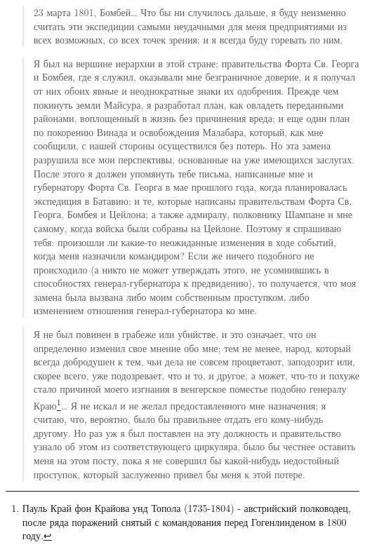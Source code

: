 \documentclass[
  oneside,
  12pt,
  titlepage]{book}
\begin{document}
\begin{quote}
23 марта 1801, Бомбей\ldots{}
Что бы ни случилось дальше, я буду неизменно считать эти экспедиции самыми неудачными для меня предприятиями из всех возможных, со всех точек зрения; и я всегда буду горевать по ним.
\end{quote}

\begin{quote}
Я был на вершине иерархии в этой стране; правительства Форта Св. Георга и Бомбея, где я служил, оказывали мне безграничное доверие, и я получал от них обоих явные и неоднократные знаки их одобрения. Прежде чем покинуть земли Майсура, я разработал план, как овладеть переданными районами, воплощенный в жизнь без причинения вреда; и еще один план по покорению Винада и освобождения Малабара, который, как мне сообщили, с нашей стороны осуществился без потерь. Но эта замена разрушила все мои перспективы, основанные на уже имеющихся заслугах. После этого я должен упомянуть тебе письма, написанные мне и губернатору Форта Св. Георга в мае прошлого года, когда планировалась экспедиция в Батавию; и те, которые написаны правительствам Форта Св. Георга, Бомбея и Цейлона; а также адмиралу, полковнику Шампане и мне самому, когда войска были собраны на Цейлоне. Поэтому я спрашиваю тебя: произошли ли какие-то неожиданные изменения в ходе событий, когда меня назначили командиром? Если же ничего подобного не происходило (а никто не может утверждать этого, не усомнившись в способностях генерал-губернатора к предвидению), то получается, что моя замена была вызвана либо моим собственным проступком, либо изменением отношения генерал-губернатора ко мне.
\end{quote}

\begin{quote}
Я не был повинен в грабеже или убийстве, и это означает, что он определенно изменил свое мнение обо мне; тем не менее, народ, который всегда добродушен к тем, чьи дела не совсем процветают, заподозрит или, скорее всего, уже подозревает, что и то, и другое, а может, что-то и похуже стало причиной моего изгнания в венгерское поместье подобно генералу Краю\footnote{Пауль Край фон Крайова унд Топола (1735-1804) - австрийский полководец, после ряда поражений снятый с командования перед Гогенлинденом в 1800 году.}\ldots{} Я не искал и не желал предоставленного мне назначения; я считаю, что, вероятно, было бы правильнее отдать его кому-нибудь другому. Но раз уж я был поставлен на эту должность и правительство узнало об этом из соответствующего циркуляра, было бы честнее оставить меня на этом посту, пока я не совершил бы какой-нибудь недостойный проступок, который заслуженно привел бы меня к этой потере.
\end{quote}
\end{document}
